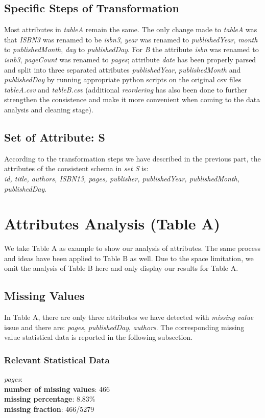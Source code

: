 \documentclass[10pt, oneside]{article}
\begin{document}
 \subsection*{Specific Steps of Transformation}
 Most attributes in \textit{tableA} remain the same. The only change made to \textit{tableA} was that \textit{ISBN3} was renamed to be \textit{isbn3},
 \textit{year} was renamed to \textit{publishedYear},  \textit{month} to \textit{publishedMonth}, \textit{day} to \textit{publishedDay}. For \textit{B}
 the attribute \textit{isbn} was renamed to \textit{isnb3}, \textit{pageCount} was renamed to \textit{pages}; attribute \textit{date} has been properly 
 parsed and split into three separated attributes \textit{publishedYear}, \textit{publishedMonth} and \textit{publishedDay} by running appropriate python scripts on the original csv files \textit{tableA.csv} 
 and \textit{tableB.csv} (additional \textit{reordering} has also been done to further strengthen the consistence and make it more convenient when coming to the data analysis and cleaning stage).
 
 \subsection*{Set of Attribute: S}
 According to the transformation steps we have described in the previous part, the attributes of the consistent schema in \textit{set S} is: \\
\textit{ id, title, authors, ISBN13, pages, publisher,  publishedYear, publishedMonth, publishedDay}.


\section*{Attributes Analysis (Table A)}
We take Table A as example to show our analysis of attributes. The same process and ideas have been applied to Table B as well. Due to the space limitation, we omit the analysis of 
Table B here and only display our results for Table A. 
\subsection*{Missing Values}
In Table A, there are only three attributes we have detected with \textit{missing value} issue and there are: \textit{pages}, \textit{publishedDay}, \textit{authors}. The corresponding 
missing value statistical data is reported in the following subsection.

\subsubsection*{Relevant Statistical Data}
\textit{pages}:\\ 
\textbf{number of missing values}: 466\\ 
\textbf{missing percentage}: 8.83\%\\ 
\textbf{missing fraction}: 466/5279 
\end{document}
